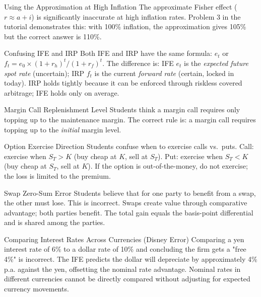 \documentclass[11pt,a4paper]{article}
\begin{document}
\begin{mistakebox}{Using the Approximation at High Inflation}
The approximate Fisher effect ($r \approx a + i$) is significantly inaccurate at high inflation rates. Problem 3 in the tutorial demonstrates this: with 100\% inflation, the approximation gives 105\% but the correct answer is 110\%.
\end{mistakebox}

\begin{mistakebox}{Confusing IFE and IRP}
Both IFE and IRP have the same formula: $e_t$ or $f_t = e_0 \times (1+r_h)^t/(1+r_f)^t$. The difference is: IFE $e_t$ is the \textit{expected future spot rate} (uncertain); IRP $f_t$ is the current \textit{forward rate} (certain, locked in today). IRP holds tightly because it can be enforced through riskless covered arbitrage; IFE holds only on average.
\end{mistakebox}

\begin{mistakebox}{Margin Call Replenishment Level}
Students think a margin call requires only topping up to the maintenance margin. The correct rule is: a margin call requires topping up to the \textit{initial} margin level.
\end{mistakebox}

\begin{mistakebox}{Option Exercise Direction}
Students confuse when to exercise calls vs.\ puts. Call: exercise when $S_T > K$ (buy cheap at $K$, sell at $S_T$). Put: exercise when $S_T < K$ (buy cheap at $S_T$, sell at $K$). If the option is out-of-the-money, do not exercise; the loss is limited to the premium.
\end{mistakebox}

\begin{mistakebox}{Swap Zero-Sum Error}
Students believe that for one party to benefit from a swap, the other must lose. This is incorrect. Swaps create value through comparative advantage; both parties benefit. The total gain equals the basis-point differential and is shared among the parties.
\end{mistakebox}

\begin{mistakebox}{Comparing Interest Rates Across Currencies (Disney Error)}
Comparing a yen interest rate of 6\% to a dollar rate of 10\% and concluding the firm gets a "free 4\%" is incorrect. The IFE predicts the dollar will depreciate by approximately 4\% p.a. against the yen, offsetting the nominal rate advantage. Nominal rates in different currencies cannot be directly compared without adjusting for expected currency movements.
\end{mistakebox}
\end{document}
